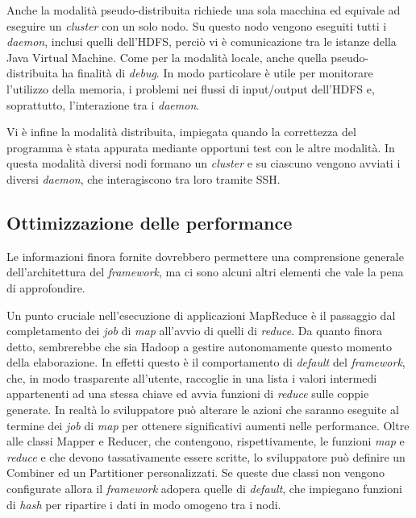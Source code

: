Anche la modalità pseudo-distribuita richiede una sola macchina ed equivale ad eseguire un \textit{cluster} con un solo nodo. Su questo nodo vengono eseguiti tutti i \textit{daemon}, inclusi 
quelli dell’HDFS, perciò vi è comunicazione tra le istanze della Java Virtual Machine. Come per la modalità locale, anche quella pseudo-distribuita ha finalità di \textit{debug}. In 
modo particolare è utile per monitorare l’utilizzo della memoria, i problemi nei flussi di input/output dell’HDFS e, soprattutto, l’interazione tra i \textit{daemon}.

Vi è infine la modalità distribuita, impiegata quando la correttezza del programma è stata appurata mediante opportuni test con le altre modalità. In questa modalità diversi 
nodi formano un \textit{cluster} e su ciascuno vengono avviati i diversi \textit{daemon}, che interagiscono tra loro tramite SSH.


\subsection{Ottimizzazione delle performance}
\label{par:hadoopimprove}

Le informazioni finora fornite dovrebbero permettere una comprensione generale dell’architettura del \textit{framework}, ma ci sono alcuni altri elementi che vale la pena di approfondire.

Un punto cruciale nell’esecuzione di applicazioni MapReduce è il passaggio dal completamento dei \textit{job} di \textit{map} all’avvio di quelli di \textit{reduce}. Da quanto finora detto, sembrerebbe che 
sia Hadoop a gestire autonomamente questo momento della elaborazione. In effetti questo è il comportamento di \textit{default} del \textit{framework}, che, in modo trasparente all’utente, raccoglie 
in una lista i valori intermedi appartenenti ad una stessa chiave ed avvia funzioni di \textit{reduce} sulle coppie generate. In realtà lo sviluppatore può alterare le azioni che saranno 
eseguite al termine dei \textit{job} di \textit{map} per ottenere significativi aumenti nelle performance. Oltre alle classi Mapper e Reducer, che contengono, rispettivamente, le funzioni \textit{map} e 
\textit{reduce} e che devono tassativamente essere scritte, lo sviluppatore può definire un Combiner ed un Partitioner personalizzati. Se queste due classi non vengono configurate allora 
il \textit{framework} adopera quelle di \textit{default}, che impiegano funzioni di \textit{hash} per ripartire i dati in modo omogeno tra i nodi.

